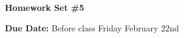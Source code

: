 
\usepackage{braket}

\def\ketY{\ensuremath{\ket {\Psi}}}
\def\iGeV{\ensuremath{\textrm{GeV}^{-1}}}
\def\mp{\ensuremath{m_{\textrm{proton}}}}
\def\rp{\ensuremath{r_{\textrm{proton}}}}
\def\me{\ensuremath{m_{\textrm{electron}}}}
\def\aG{\ensuremath{\alpha_G}}
\def\rAtom{\ensuremath{r_{\textrm{atom}}}}
\def\rNucl{\ensuremath{r_{\textrm{nucleus}}}}
\def\GN{\ensuremath{\textrm{G}_\textrm{N}}}

\def\be{\begin{equation*}}
\def\ee{\end{equation*}}


\usepackage{fancyhdr}
\usepackage{cancel}
\usepackage{ mathrsfs }





\fancyhf{}

\thispagestyle{fancy}






\begin{center}
{\huge \textbf{Homework Set \#5}}
\large

{\textbf{ Due Date:} Before class Friday February 22nd  } 
\end{center}

